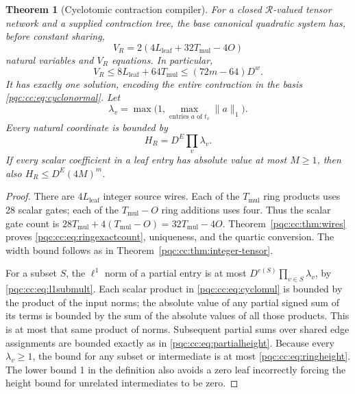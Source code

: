 \documentclass[11pt,letterpaper]{article}
\numberwithin{equation}{section}
\newtheorem{theorem}{Theorem}[section]
\theoremstyle{definition}
\theoremstyle{remark}
\newcommand{\calR}{\mathcal R}
\newcommand{\Lleaf}{L_{\mathrm{leaf}}}
\newcommand{\Tmul}{T_{\mathrm{mul}}}
\begin{document}
\begin{theorem}[Cyclotomic contraction compiler]
\label{pqc:cc:thm:cyclotensor}
For a closed $\calR$-valued tensor network and a supplied contraction tree, the
base canonical quadratic system has, before constant sharing,
\begin{equation}
 V_R=2(4\Lleaf+32\Tmul-4O)
\label{pqc:cc:eq:ringexactcount}
\end{equation}
natural variables and $V_R$ equations. In particular,
\begin{equation}
 V_R\le 8\Lleaf+64\Tmul\le (72m-64)D^w.
\label{pqc:cc:eq:ringbound}
\end{equation}
It has exactly one solution, encoding the entire contraction in the basis
\eqref{pqc:cc:eq:cyclonormal}. Let
\begin{equation}
 \lambda_v=\max\bigl(1,\max_{\text{entries }a\text{ of }t_v}\|a\|_1\bigr).
\end{equation}
Every natural coordinate is bounded by
\begin{equation}
 H_R=D^E\prod_v\lambda_v.
\label{pqc:cc:eq:ringheight}
\end{equation}
If every scalar coefficient in a leaf entry has absolute value at most
$M\ge1$, then also $H_R\le D^E(4M)^m$.
\end{theorem}
\begin{proof}
There are $4\Lleaf$ integer source wires. Each of the $\Tmul$ ring products uses 28
scalar gates; each of the $\Tmul-O$ ring additions uses four. Thus the scalar gate
count is $28\Tmul+4(\Tmul-O)=32\Tmul-4O$. Theorem~\ref{pqc:cc:thm:wires} proves
\eqref{pqc:cc:eq:ringexactcount}, uniqueness, and the quartic conversion.
The width bound follows as in Theorem~\ref{pqc:cc:thm:integer-tensor}.

For a subset $S$, the $\ell^1$ norm of a partial entry is at most
$D^{e(S)}\prod_{v\in S}\lambda_v$, by \eqref{pqc:cc:eq:l1submult}. Each scalar
product in \eqref{pqc:cc:eq:cyclomul} is bounded by the product of the input norms;
the absolute value of any partial signed sum of its terms is bounded by the
sum of the absolute values of all those products. This is at most that same
product of norms. Subsequent partial sums over shared edge assignments are
bounded exactly as in \eqref{pqc:cc:eq:partialheight}. Because every $\lambda_v\ge1$,
the bound for any subset or intermediate is at most \eqref{pqc:cc:eq:ringheight}.
The lower bound 1 in the definition also avoids a zero leaf incorrectly
forcing the height bound for unrelated intermediates to be zero.
\end{proof}
\end{document}
